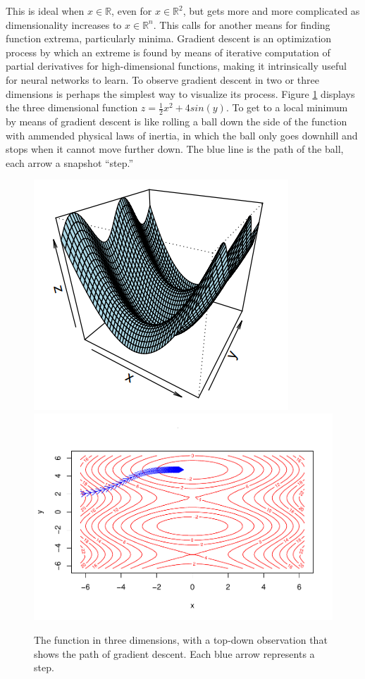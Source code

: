 This is ideal when \(x \in \mathbb{R}\), even for
\(x \in \mathbb{R}^2\), but gets more  and more complicated as
dimensionality increases to \(x \in \mathbb{R}^n\). This calls for
another means for finding function extrema, particularly minima.
Gradient descent is an optimization process by which an extreme is found by
means of iterative computation of partial derivatives for high-dimensional functions, making it intrinsically useful for neural networks to learn.  To observe gradient descent in two or three dimensions is perhaps the simplest way to visualize its process.  Figure \ref{grad} displays the three dimensional function $z = \frac{1}{2} x^2 + 4 sin(y)$.  To get to a local minimum by means of gradient descent is like rolling a ball down the side of the function with ammended physical laws of inertia, in which the ball only goes downhill and stops when it cannot move further down.  The blue line is the path of the ball, each arrow a snapshot ``step.''


\begin{figure}[H]
    \vspace{-12pt}
    \includegraphics[width = .4\textwidth]{Figures/grad_desc-51.png}
    \includegraphics[width = .6\textwidth]{Figures/grad_desc-50.pdf}
    \caption{\footnotesize The function in three dimensions, with a top-down observation that shows the path of gradient descent.  Each blue arrow represents a step.}
    \label{grad}
    \vspace{-10pt}
\end{figure}


